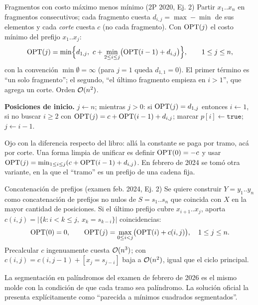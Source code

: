 \begin{problema}{Fragmentos con costo máximo menos mínimo (2P 2020, Ej. 2)}
Partir $x_1..x_n$ en fragmentos consecutivos; cada fragmento cuesta
$d_{i,j}=\max-\min$ de sus elementos y cada \emph{corte} cuesta $c$ (no cada
fragmento). Con $\mathrm{OPT}(j)$ el costo mínimo del prefijo $x_1..x_j$:
\[
\mathrm{OPT}(j)=\min\Bigl\{d_{1,j},\ c+\min_{2\le i\le j}\bigl(\mathrm{OPT}(i-1)+d_{i,j}\bigr)\Bigr\},\qquad 1\le j\le n,
\]
con la convención $\min\emptyset=\infty$ (para $j=1$ queda $d_{1,1}=0$). El
primer término es ``un solo fragmento''; el segundo, ``el último fragmento
empieza en $i>1$'', que agrega un corte. Orden $\mathcal{O}(n^2)$.

\textbf{Posiciones de inicio.} $j\gets n$; mientras $j>0$: si
$\mathrm{OPT}(j)=d_{1,j}$ entonces $i\gets1$, si no buscar $i\ge2$ con
$\mathrm{OPT}(j)=c+\mathrm{OPT}(i-1)+d_{i,j}$; marcar $p[i]\gets\texttt{true}$;
$j\gets i-1$.
\end{problema}

Ojo con la diferencia respecto del libro: allá la constante se paga por
tramo, acá por corte. Una forma limpia de unificar es definir
$\mathrm{OPT}(0)=-c$ y usar $\mathrm{OPT}(j)=\min_{1\le i\le j}(c+\mathrm{OPT}(i-1)+d_{i,j})$. En
febrero de 2024 se tomó otra variante, en la que el ``tramo'' es un prefijo
de una cadena fija.

\begin{problema}{Concatenación de prefijos (examen feb. 2024, Ej. 2)}
Se quiere construir $Y=y_1..y_n$ como concatenación de prefijos no nulos de
$S=s_1..s_n$ que coincida con $X$ en la mayor cantidad de posiciones. Si el
último prefijo cubre $x_{i+1}..x_j$, aporta
$c(i,j)=|\{k: i<k\le j,\ x_k=s_{k-i}\}|$ coincidencias:
\[
\mathrm{OPT}(0)=0,\qquad \mathrm{OPT}(j)=\max_{0\le i<j}\bigl(\mathrm{OPT}(i)+c(i,j)\bigr),\quad 1\le j\le n.
\]
Precalcular $c$ ingenuamente cuesta $\mathcal{O}(n^3)$; con
$c(i,j)=c(i,j-1)+[x_j=s_{j-i}]$ baja a $\mathcal{O}(n^2)$, igual que el ciclo
principal.
\end{problema}

La segmentación en palíndromos del examen de febrero de 2026 es el mismo
molde con la condición de que cada tramo sea palíndromo. La solución oficial
la presenta explícitamente como ``parecida a mínimos cuadrados
segmentados''.

